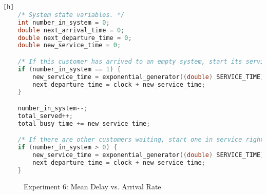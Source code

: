 \begin{lstlisting}[gobble=8, language=C, caption={Modifications to Experiment 6 Code}, label={list:exp6}, numbers=none][h]
	/* System state variables. */
	int number_in_system = 0;
	double next_arrival_time = 0;
	double next_departure_time = 0;
	double new_service_time = 0;

	/* If this customer has arrived to an empty system, start its service right away. */
	if (number_in_system == 1) {
		new_service_time = exponential_generator((double) SERVICE_TIME);
		next_departure_time = clock + new_service_time;
	}

	number_in_system--;
	total_served++;
	total_busy_time += new_service_time;

	/* If there are other customers waiting, start one in service right away. */
	if (number_in_system > 0) {
		new_service_time = exponential_generator((double) SERVICE_TIME);
		next_departure_time = clock + new_service_time;
	}
\end{lstlisting}

\begin{figure}[h]
	\centering
	\caption{Experiment 6: Mean Delay vs. Arrival Rate}
	\label{fig:exp6}
\end{figure}

%
%
%
%